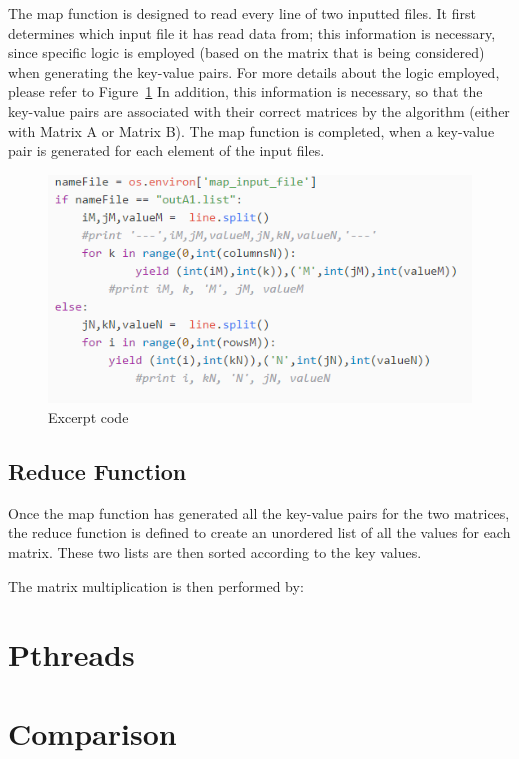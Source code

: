 \documentclass[journal, a4paper]{IEEEtran}
\begin{document}
The map function is designed to read every line of two inputted files. It first determines which input file it has read data from; this information is necessary, since specific logic is employed (based on the matrix that is being considered) when generating the key-value pairs. For more details about the logic employed, please refer to Figure~\ref{code} In addition, this information is necessary, so that the key-value pairs are associated with their correct matrices by the algorithm (either with Matrix A or Matrix B). The map function is completed, when a key-value pair is generated for each element of the input files. 

	\begin{figure}[hbtp!]
		\centering
		\includegraphics[scale = 1]{code.png}
		\caption{Excerpt code}
		\label {code}
	\end{figure}


\subsection{Reduce Function}
\noindent
Once the map function has generated all the key-value pairs for the two matrices, the reduce function is defined to create an unordered list of all the values for each matrix. These two lists are then sorted according to the key values. 

The matrix multiplication is then performed by: 

\section{Pthreads}

\noindent



\section{Comparison}
\end{document}
